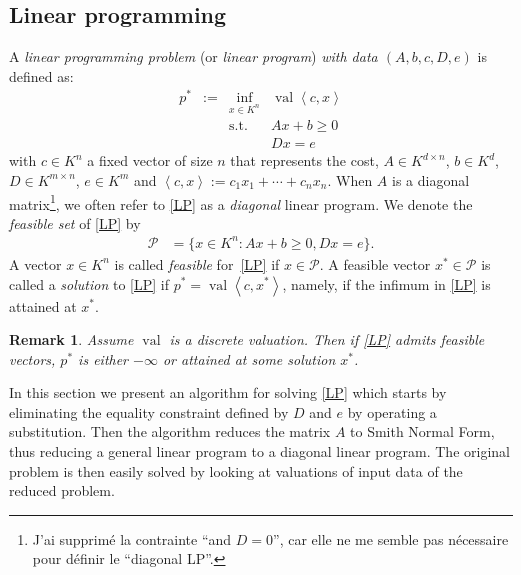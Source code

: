 \documentclass[a4paper,12pt]{article}
\newtheorem{remark}[theorem]{Remark}
\newcommand{\PP}{\mathcal{P}}
\newcommand{\simone}[1]{{\color{blue} #1}} %
\DeclareMathOperator{\val}{val}
\begin{document}




\subsection{Linear programming}


A \emph{linear programming problem} (or \emph{linear program}) \emph{with data $(A,b,c,D,e)$} is defined
as:
\begin{equation}
  \tag{LP}\label{LP}
\begin{array}{rcll}
  p^* & := & \inf_{x \in K^n} & \val \left\langle c, x \right\rangle \\
  &    & \text{s.t.}         & A x + b \geq 0\\
  & & & D x = e
\end{array}
\end{equation}
with $c \in K^n$ a fixed vector of size $n$ that represents the cost,
$A \in K^{d \times n}$, $b \in K^d$, $D \in K^{m\times n}$, $e \in K^m$ 
and $\left\langle c, x \right\rangle := c_1 x_1+\cdots +c_n x_n$.
When $A$ is a diagonal matrix\footnote{\simone{J'ai supprimé la contrainte ``and
$D=0$'', car elle ne me semble pas nécessaire pour définir le ``diagonal LP''.}},
we often refer to \eqref{LP} as a \emph{diagonal} linear program.
We denote the \emph{feasible set} of \eqref{LP} by
\begin{equation*}
\begin{aligned}
  \PP  &= \{x \in K^n : Ax + b \geq 0, Dx = e\}.
\end{aligned}
\end{equation*}
A vector $x \in K^n$ is called \emph{feasible} for~\eqref{LP} if $x \in \PP$. A feasible vector $x^* \in \PP$ is called a \emph{solution} to \eqref{LP} if $p^* = \val\left\langle c,x^*\right\rangle$, namely, if the infimum in \eqref{LP} is attained at $x^*$.

\begin{remark}
  Assume $\val$ is a discrete valuation. Then if \eqref{LP} admits feasible vectors,
  $p^*$ is either $-\infty$ or attained at some solution $x^*$.
\end{remark}

In this section we present an algorithm for solving \eqref{LP} which starts by
eliminating the equality constraint defined by $D$ and $e$ by operating a substitution.
Then the algorithm reduces the matrix $A$ to Smith Normal Form, thus reducing a general
linear program to a diagonal linear program. The original problem is then easily solved
by looking at valuations of input data of the reduced problem.
\end{document}
